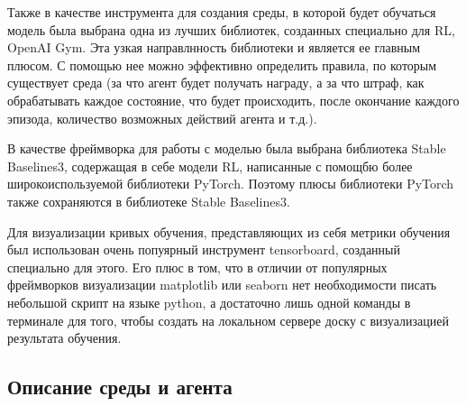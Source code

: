 \documentclass[bachelor, och, coursework]{shiza}
\begin{document}
Также в качестве инструмента для создания среды, в которой будет обучаться модель была выбрана одна из лучших библиотек, созданных специально для RL, OpenAI Gym. Эта
узкая направлнность библиотеки и является ее главным плюсом. С помощью нее можно эффективно определить правила, по которым существует среда (за что агент будет получать
награду, а за что штраф, как обрабатывать каждое состояние, что будет происходить, после окончание каждого эпизода, количество возможных действий агента и т.д.).

В качестве фреймворка для работы с моделью была выбрана библиотека Stable Baselines3, содержащая в себе модели RL, написанные с помощбю более широкоиспользуемой библиотеки PyTorch.
Поэтому плюсы библиотеки PyTorch также сохраняются в библиотеке Stable Baselines3.

Для визуализации кривых обучения, представляющих из себя метрики обучения был использован очень попуярный инструмент tensorboard, созданный специально для этого. Его плюс в том,
что в отличии от популярных фреймворков визуализации matplotlib или seaborn нет необходимости писать небольшой скрипт на языке python, а достаточно лишь одной команды в терминале
для того, чтобы создать на локальном сервере доску с визуализацией результата обучения.

\subsection{Описание среды и агента}
\end{document}
